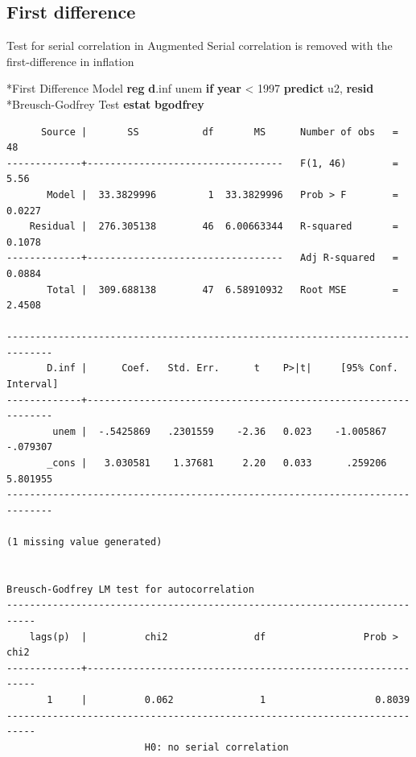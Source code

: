 \documentclass[
]{book}
\newenvironment{Shaded}{\begin{snugshade}}{\end{snugshade}}
\newcommand{\FunctionTok}[1]{\textcolor[rgb]{0.13,0.29,0.53}{\textbf{#1}}}
\newcommand{\KeywordTok}[1]{\textcolor[rgb]{0.13,0.29,0.53}{\textbf{#1}}}
\newcommand{\NormalTok}[1]{#1}
\begin{document}
\subsection*{First difference}\label{first-difference}

Test for serial correlation in Augmented
Serial correlation is removed with the first-difference in inflation

\begin{Shaded}
\begin{Highlighting}[]
\NormalTok{*First Difference Model}
\KeywordTok{reg} \KeywordTok{d}\NormalTok{.inf unem }\KeywordTok{if} \FunctionTok{year}\NormalTok{ \textless{} 1997}
\KeywordTok{predict}\NormalTok{ u2, }\KeywordTok{resid}
\NormalTok{*Breusch{-}Godfrey Test}
    \KeywordTok{estat} \KeywordTok{bgodfrey}
\end{Highlighting}
\end{Shaded}

\begin{verbatim}
      Source |       SS           df       MS      Number of obs   =        48
-------------+----------------------------------   F(1, 46)        =      5.56
       Model |  33.3829996         1  33.3829996   Prob > F        =    0.0227
    Residual |  276.305138        46  6.00663344   R-squared       =    0.1078
-------------+----------------------------------   Adj R-squared   =    0.0884
       Total |  309.688138        47  6.58910932   Root MSE        =    2.4508

------------------------------------------------------------------------------
       D.inf |      Coef.   Std. Err.      t    P>|t|     [95% Conf. Interval]
-------------+----------------------------------------------------------------
        unem |  -.5425869   .2301559    -2.36   0.023    -1.005867    -.079307
       _cons |   3.030581    1.37681     2.20   0.033      .259206    5.801955
------------------------------------------------------------------------------

(1 missing value generated)


Breusch-Godfrey LM test for autocorrelation
---------------------------------------------------------------------------
    lags(p)  |          chi2               df                 Prob > chi2
-------------+-------------------------------------------------------------
       1     |          0.062               1                   0.8039
---------------------------------------------------------------------------
                        H0: no serial correlation
\end{verbatim}
\end{document}
